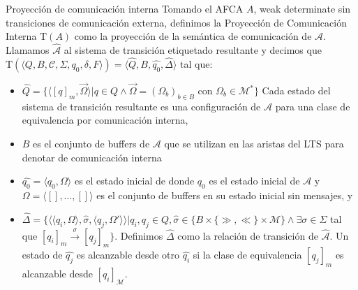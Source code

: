 \documentclass[10pt,xcolor={table,dvipsnames},t]{beamer}
\newcommand{\Tau}{\mathrm{T}}
\begin{document}
\begin{frame}{Proyección de comunicación interna}
Tomando el AFCA $A$, weak determinate sin transiciones de comunicación externa, definimos la Proyección de Comunicación Interna $\Tau(A)$ como la proyección de la semántica de comunicación de $\mathcal{A}$. Llamamos $\widehat{\mathcal{A}}$ al sistema de transición etiquetado resultante y decimos que $\Tau (\langle Q, B, \mathcal{C}, \Sigma, q_0, \delta, F \rangle)= \langle \widehat{Q}, B, \widehat{q_0}, \widehat{\Delta} \rangle$ tal que:
\begin{itemize}
    \item $ \widehat{Q} = \{ \langle [q]_m, \overrightarrow{\Omega} \rangle | q \in Q \land \overrightarrow{\Omega} = (\Omega_b)_{b \in B}$ con $\Omega_b \in \mathcal{M}^* \}$ Cada estado del sistema de transición resultante es una configuración de $\mathcal{A}$ para una clase de equivalencia por comunicación interna,
    \item $B$ es el conjunto de buffers de $\mathcal{A}$ que se utilizan en las aristas del LTS para denotar de comunicación interna
    \item $\widehat{q_0}= \langle q_0, \Omega \rangle$ es el estado inicial de  donde $q_0$ es el estado inicial de $\mathcal{A}$ y $\Omega = \langle [], \ldots, [] \rangle$ es el conjunto de buffers en su estado inicial sin mensajes, y
    \item $\widehat{\Delta}= \{\langle \langle q_i, \Omega \rangle, \widehat{\sigma},\langle q_j, \Omega' \rangle \rangle | q_i, q_j \in Q, \widehat{\sigma} \in \{B \times \{\gg, \ll\} \times \mathcal{M}\} \land \exists \sigma \in \Sigma$ tal que  $[q_i]_m \xrightarrow{\sigma} [q_j]_m \}$. Definimos $\widehat{\Delta}$ como la relación de transición de $\widehat{\mathcal{A}}$. Un estado de $\widehat{q_j}$ es alcanzable desde otro $\widehat{q_i}$ si la clase de equivalencia $[q_j]_m$ es alcanzable desde $[q_i]_\mathcal{M}$.
\end{itemize}
\end{frame}
\end{document}
